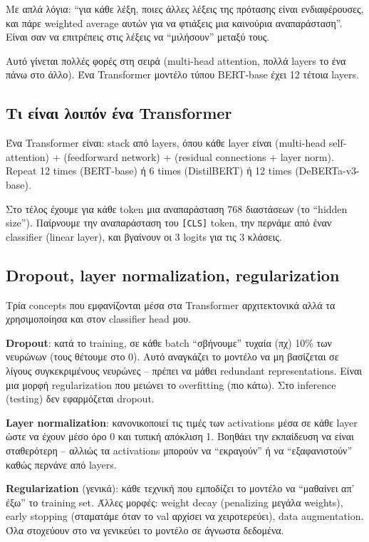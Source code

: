\documentclass[12pt]{fphw}
\begin{document}
Με απλά λόγια: ``για κάθε λέξη, ποιες άλλες λέξεις της πρότασης είναι ενδιαφέρουσες, και πάρε weighted average αυτών για να φτιάξεις μια καινούρια αναπαράσταση''. Είναι σαν να επιτρέπεις στις λέξεις να ``μιλήσουν'' μεταξύ τους.

Αυτό γίνεται πολλές φορές στη σειρά (multi-head attention, πολλά layers το ένα πάνω στο άλλο). Ένα Transformer μοντέλο τύπου BERT-base έχει 12 τέτοια layers.

\subsection{Τι είναι λοιπόν ένα Transformer}

Ένα Transformer είναι: stack από layers, όπου κάθε layer είναι (multi-head self-attention) + (feedforward network) + (residual connections + layer norm). Repeat 12 times (BERT-base) ή 6 times (DistilBERT) ή 12 times (DeBERTa-v3-base).

Στο τέλος έχουμε για κάθε token μια αναπαράσταση 768 διαστάσεων (το ``hidden size''). Παίρνουμε την αναπαράσταση του \texttt{[CLS]} token, την περνάμε από έναν classifier (linear layer), και βγαίνουν οι 3 logits για τις 3 κλάσεις.

\subsection{Dropout, layer normalization, regularization}

Τρία concepts που εμφανίζονται μέσα στα Transformer αρχιτεκτονικά αλλά τα χρησιμοποίησα και στον classifier head μου.

\textbf{Dropout}: κατά το training, σε κάθε batch ``σβήνουμε'' τυχαία (πχ) 10\% των νευρώνων (τους θέτουμε στο 0). Αυτό αναγκάζει το μοντέλο να μη βασίζεται σε λίγους συγκεκριμένους νευρώνες -- πρέπει να μάθει redundant representations. Είναι μια μορφή regularization που μειώνει το overfitting (πιο κάτω). Στο inference (testing) δεν εφαρμόζεται dropout.

\textbf{Layer normalization}: κανονικοποιεί τις τιμές των activations μέσα σε κάθε layer ώστε να έχουν μέσο όρο 0 και τυπική απόκλιση 1. Βοηθάει την εκπαίδευση να είναι σταθερότερη -- αλλιώς τα activations μπορούν να ``εκραγούν'' ή να ``εξαφανιστούν'' καθώς περνάνε από layers.

\textbf{Regularization} (γενικά): κάθε τεχνική που εμποδίζει το μοντέλο να ``μαθαίνει απ' έξω'' το training set. Άλλες μορφές: weight decay (penalizing μεγάλα weights), early stopping (σταματάμε όταν το val αρχίσει να χειροτερεύει), data augmentation. Όλα στοχεύουν στο να γενικεύει το μοντέλο σε άγνωστα δεδομένα.
\end{document}
